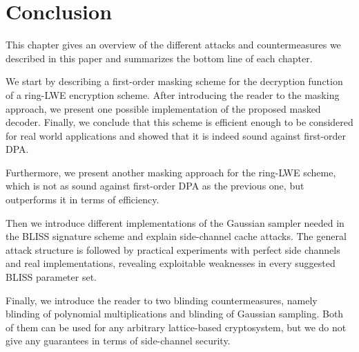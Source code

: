 \chapter{Conclusion}
This chapter gives an overview of the different attacks and countermeasures we described in this paper and summarizes the bottom line of each chapter.

We start by describing a first-order masking scheme for the decryption function of a \ac{ring-LWE} encryption scheme. After introducing the reader to the masking approach, we present one possible implementation of the proposed masked decoder. Finally, we conclude that this scheme is efficient enough to be considered for real world applications and showed that it is indeed sound against first-order \ac{DPA}.

Furthermore, we present another masking approach for the \ac{ring-LWE} scheme, which is not as sound against first-order \ac{DPA} as the previous one, but outperforms it in terms of efficiency.

Then we introduce different implementations of the Gaussian sampler needed in the \ac{BLISS} signature scheme and explain side-channel cache attacks. The general attack structure is followed by practical experiments with perfect side channels and real implementations, revealing exploitable weaknesses in every suggested \ac{BLISS} parameter set.

Finally, we introduce the reader to two blinding countermeasures, namely blinding of polynomial multiplications and blinding of Gaussian sampling. Both of them can be used for any arbitrary lattice-based cryptosystem, but we do not give any guarantees in terms of side-channel security.


